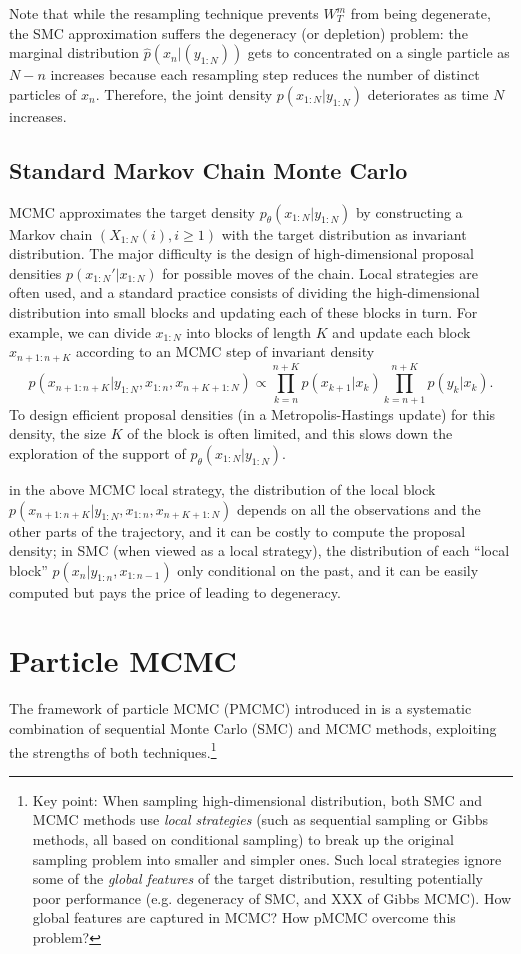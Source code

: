 \documentclass[12pt]{article}
\newcommand{\fpar}[1]{\bigskip\noindent{\textbf{\emph{#1}}}}
\def\phat{\widehat{p}}
\begin{document}
 
\fpar{Drawbacks of SMC.} Note that while the resampling technique prevents $W_T^m$ from being degenerate, the SMC approximation suffers the  degeneracy (or depletion) problem: the marginal distribution $\phat(x_n|(y_{1:N}))$ gets to concentrated on a single particle as $N-n$ increases because each resampling step reduces the number of distinct particles of $x_n$. Therefore, the joint density $p(x_{1:N}|y_{1:N})$ deteriorates as time $N$ increases. 

%
\subsection{Standard Markov Chain Monte Carlo}
MCMC approximates the target density $p_\theta(x_{1:N}|y_{1:N})$ by constructing a Markov chain $(X_{1:N}(i), i \geq 1)$ with the target distribution as invariant distribution. The major difficulty is the design of high-dimensional proposal densities $p(x_{1:N}'|x_{1:N})$ for possible moves of the chain. Local strategies are often used, and a standard practice consists of dividing the high-dimensional distribution into small blocks and updating each of these blocks in turn. For example, we can divide $x_{1:N}$ into blocks of length $K$ and update each block $x_{n+1:n+K}$ according to an MCMC step of invariant density 
\[
p(x_{n+1:n+K} |y_{1:N}, x_{1:n}, x_{n+K+1:N})\propto \prod_{k=n}^{n+K} p(x_{k+1}|x_{k}) \prod_{k=n+1}^{n+K} p(y_k|x_k). 
\] To design efficient proposal densities (in a Metropolis-Hastings update) for this density, the size $K$ of the block is often limited, and this slows down the exploration of the support of $p_\theta(x_{1:N}|y_{1:N})$. 

\fpar{Comparison of MCMC and SMC:} in the above MCMC local strategy, the distribution of the local block $p(x_{n+1:n+K} |y_{1:N}, x_{1:n}, x_{n+K+1:N})$ depends on all the observations and the other parts of the trajectory, and it can be costly to compute the proposal density; 
in SMC (when viewed as a local strategy),  the distribution of each ``local block'' $p(x_n|y_{1:n}, x_{1:n-1})$ only conditional on the past, and it can be easily computed but pays the price of leading to degeneracy.  

\section{Particle MCMC}
The framework of particle MCMC (PMCMC) introduced in \cite{andrieu2010particle} is a systematic combination of sequential Monte Carlo (SMC) and MCMC methods, exploiting the strengths of both techniques.\footnote{Key point: When sampling high-dimensional distribution, both SMC and MCMC methods use \emph{local strategies} (such as sequential sampling or Gibbs methods, all based on conditional sampling) to break up the original sampling problem into smaller and simpler ones. Such local strategies ignore some of the \emph{global features} of the target distribution, resulting potentially poor performance (e.g. degeneracy of SMC, and XXX of Gibbs MCMC). How global features are captured in MCMC? How pMCMC overcome this problem?}
\end{document}

